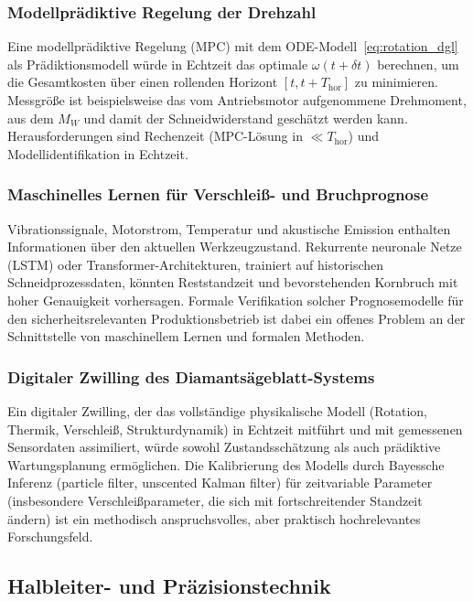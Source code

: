﻿\documentclass[a4paper,12pt]{article}
\theoremstyle{definition}
\begin{document}
\subsubsection{Modellprädiktive Regelung der Drehzahl}

Eine modellprädiktive Regelung (MPC) mit dem ODE-Modell~\eqref{eq:rotation_dgl}
als Prädiktionsmodell würde in Echtzeit das optimale $\omega(t+\delta t)$ berechnen,
um die Gesamtkosten über einen rollenden Horizont $[t, t+T_{\mathrm{hor}}]$ zu minimieren.
Messgröße ist beispielsweise das vom Antriebsmotor aufgenommene Drehmoment, aus dem
$M_W$ und damit der Schneidwiderstand geschätzt werden kann. Herausforderungen sind
Rechenzeit (MPC-Lösung in $\ll T_{\mathrm{hor}}$) und Modellidentifikation in Echtzeit.

\subsubsection{Maschinelles Lernen für Verschleiß- und Bruchprognose}

Vibrationssignale, Motorstrom, Temperatur und akustische Emission enthalten
Informationen über den aktuellen Werkzeugzustand. Rekurrente neuronale Netze (LSTM)
oder Transformer-Architekturen, trainiert auf historischen Schneidprozessdaten,
könnten Reststandzeit und bevorstehenden Kornbruch mit hoher Genauigkeit vorhersagen.
Formale Verifikation solcher Prognosemodelle für den sicherheitsrelevanten Produktionsbetrieb
ist dabei ein offenes Problem an der Schnittstelle von maschinellem Lernen und
formalen Methoden.

\subsubsection{Digitaler Zwilling des Diamantsägeblatt-Systems}

Ein digitaler Zwilling, der das vollständige physikalische Modell (Rotation,
Thermik, Verschleiß, Strukturdynamik) in Echtzeit mitführt und mit gemessenen
Sensordaten assimiliert, würde sowohl Zustandsschätzung als auch prädiktive
Wartungsplanung ermöglichen. Die Kalibrierung des Modells durch Bayessche
Inferenz (particle filter, unscented Kalman filter) für zeitvariable Parameter
(insbesondere Verschleißparameter, die sich mit fortschreitender Standzeit ändern)
ist ein methodisch anspruchsvolles, aber praktisch hochrelevantes Forschungsfeld.

\subsection{Halbleiter- und Präzisionstechnik}
\end{document}

